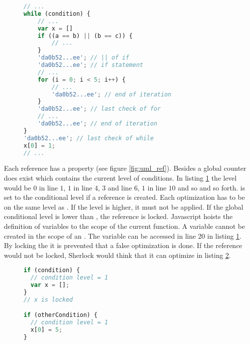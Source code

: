 \begin{figure}[htbp]
\begin{lstlisting}[language=Javascript]
// ...
while (condition) {
    // ...
    var x = []
    if ((a == b) || (b == c)) {
        // ...
    }
    'da0b52...ee'; // || of if
    'da0b52...ee'; // if statement
    // ...
    for (i = 0; i < 5; i++) {
        // ...
        'da0b52...ee'; // end of iteration
    }
    'da0b52...ee'; // last check of for
    // ...
    'da0b52...ee'; // end of iteration
}
'da0b52...ee'; // last check of while
x[0] = 1;
// ...
\end{lstlisting}
\caption{}\label{fig:example_cond_instrum}
\end{figure}

Each reference has a  property (see figure \ref{fig:uml_ref}). Besides a global counter does exist which contains the current level of conditions. In listing \ref{fig:example_cond_instrum} the level would be $0$ in line $1$, $1$ in line $4$, $3$ and line $6$, $1$ in line $10$ and so and so forth.  is set to the conditional level if a reference is created. Each optimization has to be on the same level as . If the level is higher, it must not be applied. If the global conditional level is lower than , the reference is locked. Javascript hoists the definition of variables to the scope of the current function. A variable cannot be created in the scope of an . The variable  can be accessed in line 20 in listing \ref{fig:example_cond_instrum}. By locking the  it is prevented that a false optimization is done. If the reference would not be locked, Sherlock would think that it can optimize  in listing \ref{fig:example_cond_instrum_2}.

\begin{figure}[htbp]
\begin{lstlisting}[language=Javascript]
if (condition) {
  // condition level = 1
  var x = [];
}
// x is locked

if (otherCondition) {
  // condition level = 1
  x[0] = 5;
}
\end{lstlisting}
\caption{}\label{fig:example_cond_instrum_2}
\end{figure}




